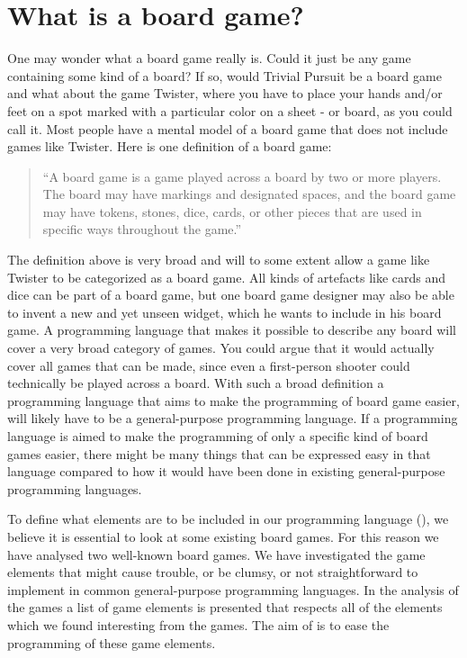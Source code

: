 \section{What is a board game?}
\label{sec:board-game-analysis}

One may wonder what a board game really is. Could it just be any game containing
some kind of a board? If so, would Trivial Pursuit be a board game and what
about the game Twister, where you have to place your hands and/or feet on a spot
marked with a particular color on a sheet - or board, as you could call it. Most
people have a mental model of a board game that does not include games like
Twister. Here is one definition of a board game:

\begin{quote}
  ``A board game is a game played across a board by two or more players. The
  board may have markings and designated spaces, and the board game may have
  tokens, stones, dice, cards, or other pieces that are used in specific ways
  throughout the game.''
  \cite{def-board-game}
\end{quote}

The definition above is very broad and will to some extent allow a game like
Twister to be categorized as a board game. All kinds of artefacts like cards and
dice can be part of a board game, but one board game designer may also be able
to invent a new and yet unseen widget, which he wants to include in his board
game. A programming language that makes it possible to describe any board will
cover a very broad category of games. You could argue that it would actually
cover all games that can be made, since even a first-person shooter could
technically be played across a board. With such a broad definition a
programming language that aims to make the programming of board game easier,
will likely have to be a general-purpose programming language. If a programming
language is aimed to make the programming of only a specific kind of board games
easier, there might be many things that can be expressed easy in that language
compared to how it would have been done in existing general-purpose programming
languages.

To define what elements are to be included in our programming language
(\productname{}), we believe it is essential to look at some existing board
games.  For this reason we have analysed two well-known board games. We have
investigated the game elements that might cause trouble, or be clumsy, or not
straightforward to implement in common general-purpose programming languages. In
the analysis of the games a list of game elements is presented that respects all
of the elements which we found interesting from the games. The aim of
\productname{} is to ease the programming of these game elements.

